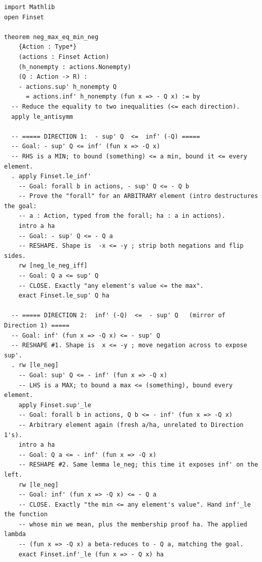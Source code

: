 \documentclass[11pt]{article}
\begin{document}
\begin{lstlisting}
import Mathlib
open Finset

theorem neg_max_eq_min_neg
    {Action : Type*}
    (actions : Finset Action)
    (h_nonempty : actions.Nonempty)
    (Q : Action -> R) :
    - actions.sup' h_nonempty Q
      = actions.inf' h_nonempty (fun x => - Q x) := by
  -- Reduce the equality to two inequalities (<= each direction).
  apply le_antisymm

  -- ===== DIRECTION 1:  - sup' Q  <=  inf' (-Q) =====
  -- Goal: - sup' Q <= inf' (fun x => -Q x)
  -- RHS is a MIN; to bound (something) <= a min, bound it <= every element.
  . apply Finset.le_inf'
    -- Goal: forall b in actions, - sup' Q <= - Q b
    -- Prove the "forall" for an ARBITRARY element (intro destructures the goal:
    -- a : Action, typed from the forall; ha : a in actions).
    intro a ha
    -- Goal: - sup' Q <= - Q a
    -- RESHAPE. Shape is  -x <= -y ; strip both negations and flip sides.
    rw [neg_le_neg_iff]
    -- Goal: Q a <= sup' Q
    -- CLOSE. Exactly "any element's value <= the max".
    exact Finset.le_sup' Q ha

  -- ===== DIRECTION 2:  inf' (-Q)  <=  - sup' Q   (mirror of Direction 1) =====
  -- Goal: inf' (fun x => -Q x) <= - sup' Q
  -- RESHAPE #1. Shape is  x <= -y ; move negation across to expose sup'.
  . rw [le_neg]
    -- Goal: sup' Q <= - inf' (fun x => -Q x)
    -- LHS is a MAX; to bound a max <= (something), bound every element.
    apply Finset.sup'_le
    -- Goal: forall b in actions, Q b <= - inf' (fun x => -Q x)
    -- Arbitrary element again (fresh a/ha, unrelated to Direction 1's).
    intro a ha
    -- Goal: Q a <= - inf' (fun x => -Q x)
    -- RESHAPE #2. Same lemma le_neg; this time it exposes inf' on the left.
    rw [le_neg]
    -- Goal: inf' (fun x => -Q x) <= - Q a
    -- CLOSE. Exactly "the min <= any element's value". Hand inf'_le the function
    -- whose min we mean, plus the membership proof ha. The applied lambda
    -- (fun x => -Q x) a beta-reduces to - Q a, matching the goal.
    exact Finset.inf'_le (fun x => - Q x) ha
\end{lstlisting}
\end{document}

